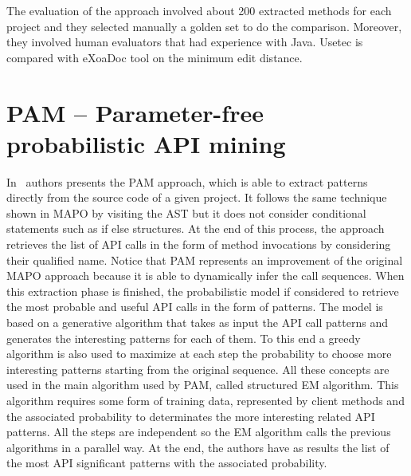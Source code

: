 The evaluation of the approach involved about 200 extracted methods for each 
project and they selected manually a golden set to do the comparison. Moreover, 
they involved human evaluators that had experience with Java. Usetec is 
compared with eXoaDoc tool on the minimum edit distance. 

\section{PAM -- Parameter-free probabilistic API mining}
In~\cite{fowkes_parameter-free_2016} authors presents the PAM approach, which 
is able to extract patterns directly from the source code of a given project.
%
%
It follows the same technique shown in MAPO by visiting the AST but it does not 
consider conditional statements such as if else structures. At the end of this 
process, the approach retrieves the list of API calls in the form of method 
invocations by considering their qualified name. Notice that PAM represents an 
improvement of the original MAPO approach because it is able to dynamically 
infer the call sequences. When this extraction phase is finished, the 
probabilistic model if considered to retrieve the most probable and useful API 
calls in the form of patterns. The model is based on a generative algorithm 
that takes as input the API call patterns and generates the interesting 
patterns for each of them. To this end a greedy algorithm is also used to 
maximize at each step the probability to choose more interesting patterns 
starting from the original sequence. All these concepts are used in the main 
algorithm used by PAM, called structured EM algorithm. This algorithm requires 
some form of training data, represented by client methods and the associated 
probability to determinates the more interesting related API patterns. All the 
steps are independent so the EM algorithm calls the previous algorithms in a 
parallel way. At the end, the authors have as results the list of the most API 
significant patterns with the associated probability. 

